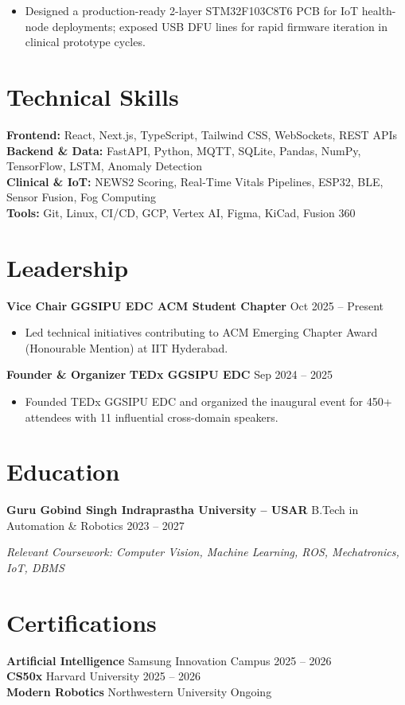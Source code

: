 \documentclass[10pt,letterpaper]{article}
\begin{document}
\begin{itemize}
    \item Designed a production-ready 2-layer STM32F103C8T6 PCB for IoT health-node deployments; exposed USB DFU lines for rapid firmware iteration in clinical prototype cycles.
\end{itemize}

\section*{Technical Skills}

\textbf{Frontend:} React, Next.js, TypeScript, Tailwind CSS, WebSockets, REST APIs \\
\textbf{Backend \& Data:} FastAPI, Python, MQTT, SQLite, Pandas, NumPy, TensorFlow, LSTM, Anomaly Detection \\
\textbf{Clinical \& IoT:} NEWS2 Scoring, Real-Time Vitals Pipelines, ESP32, BLE, Sensor Fusion, Fog Computing \\
\textbf{Tools:} Git, Linux, CI/CD, GCP, Vertex AI, Figma, KiCad, Fusion 360

\section*{Leadership}

\textbf{Vice Chair} \textbar{} \textbf{GGSIPU EDC ACM Student Chapter} \hfill Oct 2025 -- Present
\begin{itemize}
    \item Led technical initiatives contributing to ACM Emerging Chapter Award (Honourable Mention) at IIT Hyderabad.
\end{itemize}

\vspace{1pt}

\textbf{Founder \& Organizer} \textbar{} \textbf{TEDx GGSIPU EDC} \hfill Sep 2024 -- 2025
\begin{itemize}
    \item Founded TEDx GGSIPU EDC and organized the inaugural event for 450+ attendees with 11 influential cross-domain speakers.
\end{itemize}

\section*{Education}

\textbf{Guru Gobind Singh Indraprastha University -- USAR} \textbar{} B.Tech in Automation \& Robotics \hfill 2023 -- 2027

\textit{Relevant Coursework: Computer Vision, Machine Learning, ROS, Mechatronics, IoT, DBMS}

\section*{Certifications}

\textbf{Artificial Intelligence} \textbar{} Samsung Innovation Campus \hfill 2025 -- 2026 \\
\textbf{CS50x} \textbar{} Harvard University \hfill 2025 -- 2026 \\
\textbf{Modern Robotics} \textbar{} Northwestern University \hfill Ongoing
\end{document}

